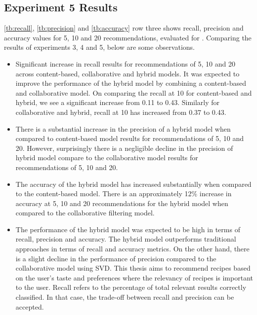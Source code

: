 \subsection{Experiment 5 Results}
\label{sec:res5}
\autoref{tb:recall}, \autoref{tb:precision} and \autoref{tb:accuracy} row three shows recall, precision and accuracy values for 5, 10 and 20 recommendations, evaluated for . Comparing the results of experiments 3, 4 and 5, below are some observations.
\begin{itemize}
\item Significant increase in recall results for recommendations of 5, 10 and 20 across content-based, collaborative and hybrid models. It was expected to improve the performance of the hybrid model by combining a content-based and collaborative model. On comparing the recall at 10 for content-based and hybrid, we see a significant increase from 0.11 to 0.43. Similarly for collaborative and hybrid, recall at 10 has increased from 0.37 to 0.43.
\item There is a substantial increase in the precision of a hybrid model when compared to content-based model results for recommendations of 5, 10 and 20. However, surprisingly there is a negligible decline in the precision of hybrid model compare to the collaborative model results for recommendations of 5, 10 and 20.
\item The accuracy of the hybrid model has increased substantially when compared to the content-based model. There is an approximately 12\% increase in accuracy at 5, 10 and 20 recommendations for the hybrid model when compared to the collaborative filtering model.
\item The performance of the hybrid model was expected to be high in terms of recall, precision and accuracy. The hybrid model outperforms traditional approaches in terms of recall and accuracy metrics. On the other hand, there is a slight decline in the performance of precision compared to the collaborative model using SVD. This thesis aims to recommend recipes based on the user's taste and preferences where the relevancy of recipes is important to the user. Recall refers to the percentage of total relevant results correctly classified. In that case, the trade-off between recall and precision can be accepted.
\end{itemize}

